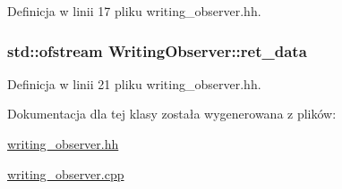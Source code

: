 Definicja w linii 17 pliku writing\-\_\-observer.\-hh.

\hypertarget{class_writing_observer_a45c8c4d5ae006232061423c657fd1eeb}{
\subsubsection[{ret\-\_\-data}]{\setlength{\rightskip}{0pt plus 5cm}std\-::ofstream Writing\-Observer\-::ret\-\_\-data\hspace{0.3cm}{\ttfamily [protected]}}}\label{class_writing_observer_a45c8c4d5ae006232061423c657fd1eeb}


Definicja w linii 21 pliku writing\-\_\-observer.\-hh.



Dokumentacja dla tej klasy została wygenerowana z plików\-:\begin{DoxyCompactItemize}
\item 
\hyperlink{writing__observer_8hh}{writing\-\_\-observer.\-hh}\item 
\hyperlink{writing__observer_8cpp}{writing\-\_\-observer.\-cpp}\end{DoxyCompactItemize}

